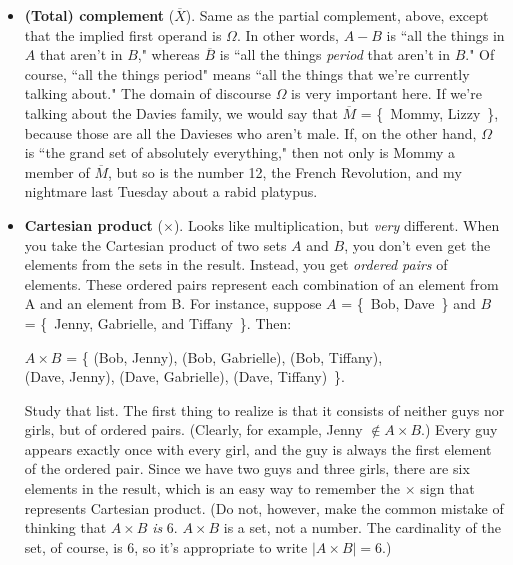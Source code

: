 \begin{itemize}
\item \label{complement} \textbf{(Total) complement} ($\overline{X}$).
 Same as the partial complement, above,
except that the implied first operand is $\Omega$. In other words, $A-B$ is
``all the things in $A$ that aren't in $B$," whereas $\overline{B}$ is
``all the things \textit{period} that aren't in $B$." Of course, ``all the
things period" means ``all the things that we're currently talking about."
The domain of discourse $\Omega$  is
very important here. If we're talking about the Davies family,
 we would say that $\overline{M}$ = \{~Mommy,
Lizzy~\}, because those are all the Davieses who aren't male. If, on the
other hand, $\Omega$ is ``the grand set of absolutely everything," then not
only is Mommy a member of $\overline{M}$, but so is the number 12, the
French Revolution, and my nightmare last Tuesday about a rabid platypus.

\item \textbf{Cartesian product} ($\times$).  Looks like multiplication, but \textit{very} different. When
you take the Cartesian product of two sets $A$ and $B$, you don't even get
the elements from the sets in the result. Instead, you get \textit{ordered
pairs}  of elements. These ordered pairs represent
each combination of an element from A and an element from B. For instance,
suppose $A$ = \{~Bob, Dave~\} and $B$ = \{~Jenny, Gabrielle, and
Tiffany~\}. Then:

\begin{center}
$A \times B$ = \{
(Bob, Jenny), (Bob, Gabrielle), (Bob, Tiffany),\\
(Dave, Jenny), (Dave, Gabrielle), (Dave, Tiffany)~\}.
\end{center}

Study that list. The first thing to realize is that it consists of neither
guys nor girls, but of ordered pairs. (Clearly, for example, Jenny $\notin
A\times B$.) Every guy appears exactly once with every girl, and the guy is
always the first element of the ordered pair.  Since we have two guys and
three girls, there are six elements in the result, which is an easy way to
remember the $\times$ sign that represents Cartesian product. (Do not,
however, make the common mistake of thinking that $A \times B$ \textit{is}
6. $A \times B$ is a set, not a number. The cardinality of the set, of
course, is 6, so it's appropriate to write $|A \times B| = 6$.)

\end{itemize}

